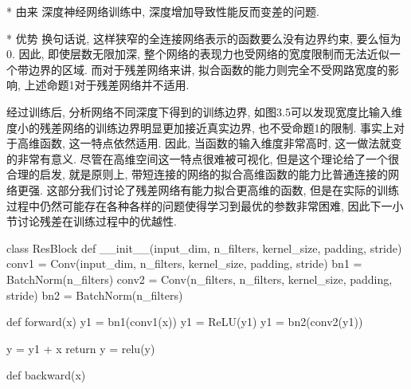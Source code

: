 		* 由来
			深度神经网络训练中, 深度增加导致性能反而变差的问题.

		* 优势
			换句话说, 这样狭窄的全连接网络表示的函数要么没有边界约束, 要么恒为0. 因此, 即使层数无限加深, 整个网络的表现力也受网络的宽度限制而无法近似一个带边界的区域. 而对于残差网络来讲, 拟合函数的能力则完全不受网路宽度的影响, 上述命题1对于残差网络并不适用. 

			经过训练后, 分析网络不同深度下得到的训练边界, 如图3.5可以发现宽度比输入维度小的残差网络的训练边界明显更加接近真实边界, 也不受命题1的限制. 事实上对于高维函数, 这一特点依然适用. 因此, 当函数的输入维度非常高时, 这一做法就变的非常有意义. 尽管在高维空间这一特点很难被可视化, 但是这个理论给了一个很合理的启发, 就是原则上, 带短连接的网络的拟合高维函数的能力比普通连接的网络更强. 这部分我们讨论了残差网络有能力拟合更高维的函数, 但是在实际的训练过程中仍然可能存在各种各样的问题使得学习到最优的参数非常困难, 因此下一小节讨论残差在训练过程中的优越性. 

		\Code
			class ResBlock
				def __init__(input_dim, n_filters, kernel_size, padding, stride)
					conv1	= Conv(input_dim, n_filters, kernel_size, padding, stride)
					bn1		= BatchNorm(n_filters)
					conv2	= Conv(n_filters, n_filters, kernel_size, padding, stride)
					bn2 	= BatchNorm(n_filters)
			
				def forward(x)
					y1 = bn1(conv1(x))
					y1 = ReLU(y1)
					y1 = bn2(conv2(y1))
			
					y = y1 + x
					return y = relu(y)

				def backward(x)